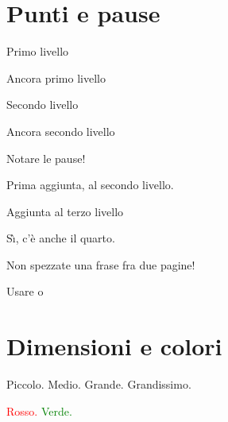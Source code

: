 \documentclass[italian,landscape]{report}
\begin{document}
\section{Punti e pause}
\begin{firstheadlineitemize}
\item Primo livello
\pause
\item Ancora primo livello
\pause
\begin{secondheadlineitemize}
\item Secondo livello
\pause
\item Ancora secondo livello
\end{secondheadlineitemize}
\pause
\item Notare le pause!
\pause
\begin{secondheadlineitemize}
\item Prima aggiunta, al secondo livello.
\pause
\begin{thirdheadlineitemize}
\item Aggiunta al terzo livello
\pause
\begin{fourthheadlineitemize}
\item S\`{\i}, c'\`{e} anche il quarto.
\pause
\end{fourthheadlineitemize}
\end{thirdheadlineitemize}
\end{secondheadlineitemize}
\item Non spezzate una frase fra due pagine!
\pause
\begin{secondheadlineitemize}
\item Usare  o 
\end{secondheadlineitemize}
\end{firstheadlineitemize}


\section{Dimensioni e colori}

\begin{firstheadlineitemize}

\item \small Piccolo. \large Medio. \Large Grande. \huge Grandissimo.

\pause
\bigskip

\item \textcolor{red}{Rosso.} \textcolor{green}{Verde.}  

\end{firstheadlineitemize}
\end{document}
